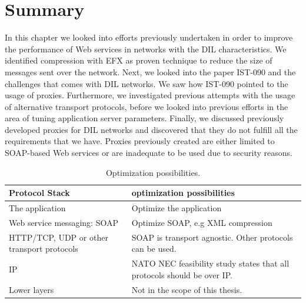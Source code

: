 \section{Summary}

In this chapter we looked into efforts previously undertaken in order to improve
the performance of Web services in networks with the DIL characteristics. We
identified compression with EFX as proven technique to reduce the size of
messages sent over the network. Next, we looked into the paper IST-090 and the
challenges that comes with DIL networks. We saw how IST-090 pointed to the usage
of proxies. Furthermore, we investigated previous attempts with the usage of
alternative transport protocols, before we looked into previous efforts in the
area of tuning application server parameters. Finally, we discussed previously
developed proxies for DIL networks and discovered that they do not fulfill all
the requirements that we have. Proxies previously created are either limited to
SOAP-based Web services or are inadequate to be used due to security reasons.

\begin{table}[h]
\begin{tabularx}{\textwidth}{| X | X |}
\hline
  \textbf{Protocol Stack} & \textbf{optimization possibilities} \\ \hline
  The application & Optimize the application\\ \hline
  Web service messaging: SOAP & Optimize SOAP, e.g XML compression \\ \hline
  HTTP/TCP, UDP or other transport protocols & SOAP is transport agnostic. Other
  protocols can be used. \\ \hline
  IP & NATO NEC feasibility study states that all protocols should be over IP. \\
  \hline
  Lower layers & Not in the scope of this thesis. \\ \hline
\end{tabularx}
\caption{Optimization possibilities.} \label{table:optimalization-overview}
\end{table}
